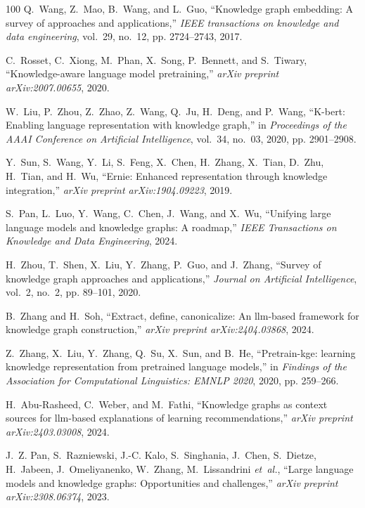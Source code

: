 \documentclass[10pt,journal,compsoc]{IEEEtran}
\begin{document}
\begin{thebibliography}{100}
	Q.~Wang, Z.~Mao, B.~Wang, and L.~Guo, ``Knowledge graph embedding: A survey of
	approaches and applications,'' \emph{IEEE transactions on knowledge and data
		engineering}, vol.~29, no.~12, pp. 2724--2743, 2017.
	
	C.~Rosset, C.~Xiong, M.~Phan, X.~Song, P.~Bennett, and S.~Tiwary,
	``Knowledge-aware language model pretraining,'' \emph{arXiv preprint
		arXiv:2007.00655}, 2020.
	
	W.~Liu, P.~Zhou, Z.~Zhao, Z.~Wang, Q.~Ju, H.~Deng, and P.~Wang, ``K-bert:
	Enabling language representation with knowledge graph,'' in \emph{Proceedings
		of the AAAI Conference on Artificial Intelligence}, vol.~34, no.~03, 2020,
	pp. 2901--2908.
	
	Y.~Sun, S.~Wang, Y.~Li, S.~Feng, X.~Chen, H.~Zhang, X.~Tian, D.~Zhu, H.~Tian,
	and H.~Wu, ``Ernie: Enhanced representation through knowledge integration,''
	\emph{arXiv preprint arXiv:1904.09223}, 2019.
	
	S.~Pan, L.~Luo, Y.~Wang, C.~Chen, J.~Wang, and X.~Wu, ``Unifying large language
	models and knowledge graphs: A roadmap,'' \emph{IEEE Transactions on
		Knowledge and Data Engineering}, 2024.
	
	H.~Zhou, T.~Shen, X.~Liu, Y.~Zhang, P.~Guo, and J.~Zhang, ``Survey of knowledge
	graph approaches and applications,'' \emph{Journal on Artificial
		Intelligence}, vol.~2, no.~2, pp. 89--101, 2020.
	
	B.~Zhang and H.~Soh, ``Extract, define, canonicalize: An llm-based framework
	for knowledge graph construction,'' \emph{arXiv preprint arXiv:2404.03868},
	2024.
	
	Z.~Zhang, X.~Liu, Y.~Zhang, Q.~Su, X.~Sun, and B.~He, ``Pretrain-kge: learning
	knowledge representation from pretrained language models,'' in \emph{Findings
		of the Association for Computational Linguistics: EMNLP 2020}, 2020, pp.
	259--266.
	
	H.~Abu-Rasheed, C.~Weber, and M.~Fathi, ``Knowledge graphs as context sources
	for llm-based explanations of learning recommendations,'' \emph{arXiv
		preprint arXiv:2403.03008}, 2024.
	
	J.~Z. Pan, S.~Razniewski, J.-C. Kalo, S.~Singhania, J.~Chen, S.~Dietze,
	H.~Jabeen, J.~Omeliyanenko, W.~Zhang, M.~Lissandrini \emph{et~al.}, ``Large
	language models and knowledge graphs: Opportunities and challenges,''
	\emph{arXiv preprint arXiv:2308.06374}, 2023.
	

\end{thebibliography}
\end{document}
